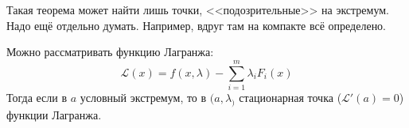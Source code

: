 \documentclass[12pt,timbord]{../../../notes}
\begin{document}
\begin{rem}
  Такая теорема может найти лишь точки, <<подозрительные>> на экстремум. Надо ещё отдельно
  думать. Например, вдруг там на компакте всё определено.
\end{rem}
\begin{rem}
  Можно рассматривать функцию Лагранжа:
  \[
    \mathcal L (x) = f(x, \lambda) - \sum_{i=1}^m \lambda_i F_i(x)
  \]
  Тогда если в $a$ условный экстремум, то в $(a,\lambda_)$ стационарная точка 
  ($\mathcal L'(a) = 0$) функции Лагранжа.
  
\end{rem}
\end{document}
